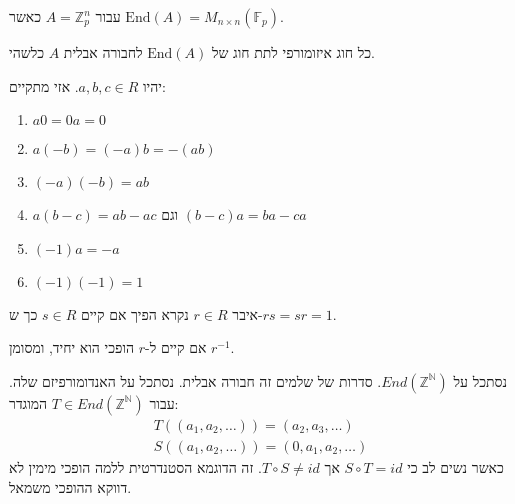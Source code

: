 \documentclass{tstextbook}
\begin{document}
\begin{example}
עבור \(A=\mathbb{Z} _p^n\) כאשר \(\mathrm{End}(A)=M_{n\times n}\left( \mathbb{F}_{p} \right)\).

\end{example}
\begin{proposition}
כל חוג איזומורפי לתת חוג של \(\mathrm{End}(A)\) לחבורה אבלית \(A\) כלשהי.

\end{proposition}
\begin{proposition}
יהיו \(a,b,c \in R\). אזי מתקיים:

  \begin{enumerate}
    \item \(a 0=0a=0\)


    \item \(a(-b)=(-a)b=-(ab)\)


    \item \((-a)(-b)=ab\)


    \item \(a(b-c)=ab-ac\) וגם \((b-c)a=ba-ca\)


    \item \((-1)a=-a\)


    \item \((-1)(-1)=1\)


  \end{enumerate}
\end{proposition}
\begin{definition}
איבר \(r\in R\) נקרא הפיך אם קיים \(s \in R\) כך ש-\(rs=sr=1\). 

\end{definition}
\begin{proposition}
אם קיים ל-\(r\) הופכי הוא יחיד, ומסומן \(r^{-1}\).

\end{proposition}
\begin{example}
נסתכל על \(End\left( \mathbb{Z} ^{\mathbb{N} } \right)\). סדרות של שלמים זה חבורה אבלית. נסתכל על האנדומורפיזם שלה. עבור \(T\in End\left( \mathbb{Z} ^{\mathbb{N} } \right)\) המוגדר:
$$\begin{gathered}T\left( \left( a_{1},a_{2},\dots \right) \right)=\left( a_{2},a_{3},\dots \right) \\S\left( \left( a_{1},a_{2},\dots \right) \right)=\left( 0,a_{1},a_{2},\dots \right)
\end{gathered}$$
כאשר נשים לב כי \(S\circ T = id\) אך \(T\circ S \neq id\). זה הדוגמא הסטנדרטית ללמה הופכי מימין לא דווקא ההופכי משמאל.

\end{example}
\end{document}
